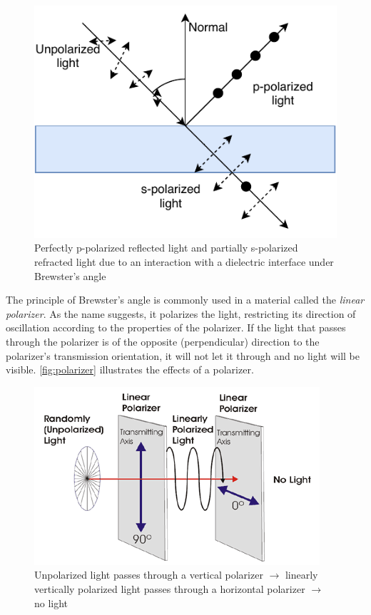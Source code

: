 \begin{figure}[h]
	\centering
	\includegraphics[width=.7\linewidth]{img/brewster.pdf}
	\caption{Perfectly p-polarized reflected light and partially s-polarized refracted light due to an interaction with a dielectric interface under Brewster's angle}
	\label{fig:brewster}
\end{figure}


The principle of Brewster's angle is commonly used in a material called the \emph{linear polarizer}. As the name suggests, it polarizes the light, restricting its direction of oscillation according to the properties of the polarizer. If the light that passes through the polarizer is of the opposite (perpendicular) direction to the polarizer's transmission orientation, it will not let it through and no light will be visible. \autoref{fig:polarizer} illustrates the effects of a polarizer.

\begin{figure}[h]
	\centering
	\includegraphics[width=.6\linewidth]{img/polarizer.png}
	\caption[nikon]{Unpolarized light passes through a vertical polarizer $\rightarrow$ linearly vertically polarized light passes through a horizontal polarizer $\rightarrow$ no light\footnotemark}
	\label{fig:polarizer}
\end{figure}

